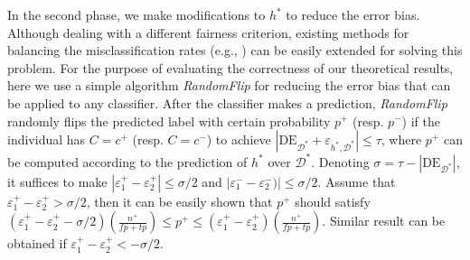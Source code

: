 \documentclass{article}
\begin{document}
In the second phase, we make modifications to $h^{*}$ to reduce the error bias. Although dealing with a different fairness criterion, existing methods for balancing the misclassification rates (e.g., \cite{hardt2016equality}) can be easily extended for solving this problem. For the purpose of evaluating the correctness of our theoretical results, here we use a simple algorithm \emph{RandomFlip} for reducing the error bias that can be applied to any classifier. 
After the classifier makes a prediction, \emph{RandomFlip} randomly flips the predicted label with certain probability $p^{+}$ (resp. $p^{-}$) if the individual has $C=c^{+}$ (resp. $C=c^{-}$) to achieve $\left|\mathrm{DE}_{\mathcal{D}^{*}} \!+\! \varepsilon_{h^{*},\mathcal{D}^{*}}\right| \leq \tau$, where $p^{+}$ can be computed according to the prediction of $h^{*}$ over $\mathcal{D}^{*}$. Denoting $\sigma = \tau - \left| \mathrm{DE}_{\mathcal{D}^{*}} \right|$, it suffices to make $|\varepsilon_{1}^{+}-\varepsilon_{2}^{+}|\leq \sigma/2$ and $|\varepsilon_{1}^{-}-\varepsilon_{2}^{-})|\leq \sigma/2$. Assume that $\varepsilon_{1}^{+}-\varepsilon_{2}^{+} > \sigma/2$, then it can be easily shown that $p^{+}$ should satisfy $( \varepsilon_{1}^{+} - \varepsilon_{2}^{+} - \sigma/2 ) \left( \frac{n^{+}}{\mathit{fp}+\mathit{tp}} \right) \leq p^{+} \leq (\varepsilon_{1}^{+} - \varepsilon_{2}^{+}) \left( \frac{n^{+}}{\mathit{fp}+\mathit{tp}} \right)$. Similar result can be obtained if $\varepsilon_{1}^{+}-\varepsilon_{2}^{+} < -\sigma/2$.

\end{document}
